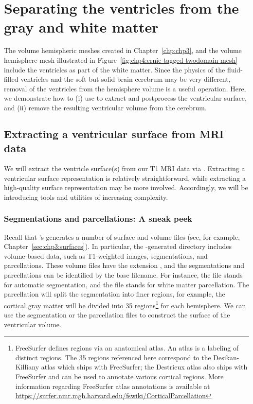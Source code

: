 \section{Separating the ventricles from the gray and white matter}
\label{sec:chp4:tools:remove-vent}

The volume hemispheric meshes created in Chapter~\ref{chp:chp3}, and the
volume hemisphere mesh illustrated in 
Figure~\ref{fig:chp4:ernie-tagged-twodomain-mesh} include the
ventricles as part of the white matter. Since the physics of the
fluid-filled ventricles and the soft but solid brain cerebrum may be
very different, removal of the ventricles from the hemisphere volume
is a useful operation. Here, we demonstrate how to (i) use
{\freesurfer} to extract and postprocess the ventricular surface, and
(ii) remove the resulting ventricular volume from the cerebrum.

\subsection{Extracting a ventricular surface from MRI data}
\label{sec:chp4:tools:remove-vent:extraction}  

We will extract the ventricle surface(s) from our T1 MRI data via
{\freesurfer}. Extracting a ventricular surface representation is
relatively straightforward, while extracting a high-quality surface
representation may be more involved. Accordingly, we will be introducing tools and
utilities of increasing complexity.

\subsubsection*{Segmentations and parcellations: A sneak peek}
 
 Recall that \freesurfer's
 generates a number of surface and volume files (see,
for example, Chapter~\ref{sec:chp3:surfaces}). In particular, the
\freesurfer{}-generated  directory includes volume-based
data, such as T1-weighted images, segmentations, and
parcellations. These volume files have the extension , and
the segmentations and parcellations can be identified by the base
filename. For instance, the file  stands for automatic
segmentation, and the file  stands for white matter
parcellation. The parcellation will split the segmentation into finer
regions, for example, the cortical gray matter will be divided into 35
regions\footnote{FreeSurfer defines regions via an anatomical atlas. An 
atlas is a labeling of distinct regions. The 35 regions referenced here 
correspond to the Desikan-Killiany atlas which ships with FreeSurfer; 
the Destrieux atlas also ships with FreeSurfer and can be used to annotate 
various cortical regions. More information regarding FreeSurfer atlas 
annotations is available at 
\url{https://surfer.nmr.mgh.harvard.edu/fswiki/CorticalParcellation}} %
for each hemisphere. We can use the segmentation or the
parcellation files to construct the surface of the ventricular volume.

